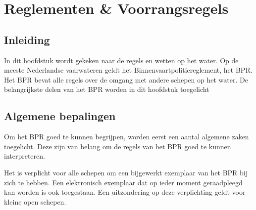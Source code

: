 \chapter{Reglementen \& Voorrangsregels}
\section{Inleiding}
In dit hoofdstuk wordt gekeken naar de regels en wetten op het water. Op de meeste Nederlandse vaarwateren geldt het Binnenvaartpolitiereglement, het BPR. Het BPR bevat alle regels over de omgang met andere schepen op het water. De belangrijkste delen van het BPR worden in dit hoofdstuk toegelicht

\section{Algemene bepalingen}
Om het BPR goed te kunnen begrijpen, worden eerst een aantal algemene zaken toegelicht. Deze zijn van belang om de regels van het BPR goed te kunnen interpreteren.

Het is verplicht voor alle schepen om een bijgewerkt exemplaar van het BPR bij zich te hebben. Een elektronisch exemplaar dat op ieder moment geraadpleegd kan worden is ook toegestaan. Een uitzondering op deze verplichting geldt voor kleine open schepen. 

